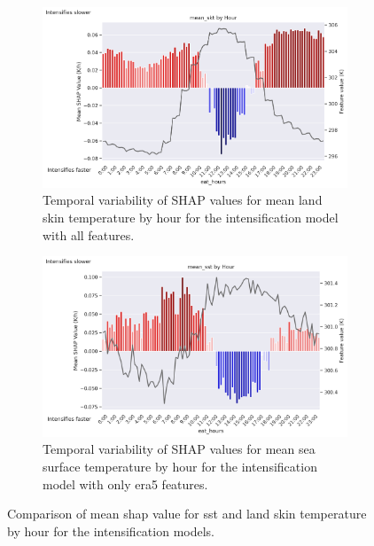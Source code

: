 \begin{figure}[ht]
    \centering
    \begin{subfigure}[t]{\textwidth}
        \centering
        \includegraphics[width=\textwidth]{../figures/generated/experiments/obs_intensification/temporal_corr/obs_intensification_all_shap_mean_skt_by_hour.png}
        \caption{Temporal variability of SHAP values for mean land skin temperature by hour for the intensification model with all features.}
        \label{fig:obs_intensification_all_shap_mean_skt_by_hour}
    \end{subfigure}
    \vspace{1em}
    \begin{subfigure}[t]{\textwidth}
        \centering
        \includegraphics[width=\textwidth]{../figures/generated/experiments/obs_intensification/temporal_corr/obs_intensification_era5_shap_mean_sst_by_hour.png}
        \caption{Temporal variability of SHAP values for mean sea surface temperature by hour for the intensification model with only \acrshort{era5} features.}
        \label{fig:obs_intensification_era5_shap_mean_sst_by_hour}
    \end{subfigure}
    \caption{Comparison of mean \acrshort{shap} value for \acrshort{sst} and land skin temperature by hour for the intensification models.}
    \label{fig:obs_intensification_sst_skt_by_hour}
\end{figure}

